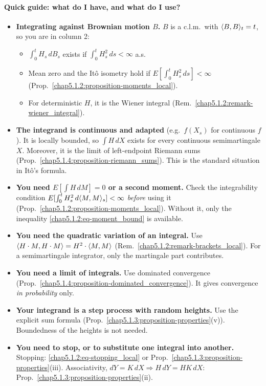 \paragraph{Quick guide: what do I have, and what do I use?}
\begin{itemize}
    \item \textbf{Integrating against Brownian motion $B$.} $B$ is a c.l.m.\ with $\langle B,B\rangle_t=t$, so you are in column 2:
    \begin{itemize}
        \item $\int_0^t H_s\,dB_s$ exists if $\int_0^t H_s^2\,ds<\infty$ a.s.
        \item Mean zero and the Itô isometry hold if $E[\int_0^t H_s^2\,ds]<\infty$ (Prop.~\ref{chap5.1.2:proposition-moments_local}).
        \item For deterministic $H$, it is the Wiener integral (Rem.~\ref{chap5.1.2:remark-wiener_integral}).
    \end{itemize}
    \item \textbf{The integrand is continuous and adapted} (e.g.\ $f(X_s)$ for continuous $f$). It is locally bounded, so $\int H\,dX$ exists for every continuous semimartingale $X$. Moreover, it is the limit of left-endpoint Riemann sums (Prop.~\ref{chap5.1.4:proposition-riemann_sums}). This is the standard situation in Itô's formula.
    \item \textbf{You need $E[\int H\,dM]=0$ or a second moment.} Check the integrability condition $E[\int_0^t H_s^2\,d\langle M,M\rangle_s]<\infty$ \emph{before} using it (Prop.~\ref{chap5.1.2:proposition-moments_local}). Without it, only the inequality \eqref{chap5.1.2:eq-moment_bound} is available.
    \item \textbf{You need the quadratic variation of an integral.} Use $\langle H\cdot M,H\cdot M\rangle=H^2\cdot\langle M,M\rangle$ (Rem.~\ref{chap5.1.2:remark-brackets_local}). For a semimartingale integrator, only the martingale part contributes.
    \item \textbf{You need a limit of integrals.} Use dominated convergence (Prop.~\ref{chap5.1.4:proposition-dominated_convergence}). It gives convergence \emph{in probability} only.
    \item \textbf{Your integrand is a step process with random heights.} Use the explicit sum formula (Prop.~\ref{chap5.1.3:proposition-properties}(v)). Boundedness of the heights is not needed.
    \item \textbf{You need to stop, or to substitute one integral into another.} Stopping: \eqref{chap5.1.2:eq-stopping_local} or Prop.~\ref{chap5.1.3:proposition-properties}(iii). Associativity, $dY=K\,dX\Rightarrow H\,dY=HK\,dX$: Prop.~\ref{chap5.1.3:proposition-properties}(ii).
\end{itemize}



